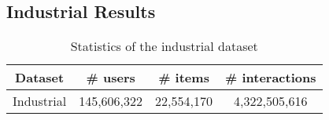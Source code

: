 



\subsection{Industrial Results}

\begin{table}
  \centering
  \caption{\label{tab:industrial_stats} Statistics of the industrial dataset}
  \begin{tabular}{c|c|c|c}
    \hline \hline
    \textbf{Dataset} & \# users & \# items & \# interactions \\
    \hline
    Industrial & 145,606,322 & 22,554,170 & 4,322,505,616 \\
    \hline \hline
  \end{tabular}
\end{table}


